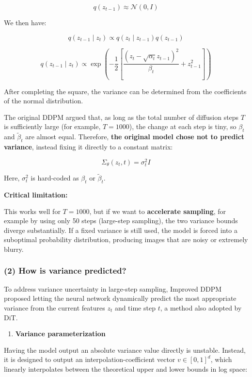 \[
q(z_{t-1})\approx\mathcal{N}(0,I)
\]

We then have:

\[
q(z_{t-1}\mid z_t)\propto q(z_t\mid z_{t-1})q(z_{t-1})
\]

\[
q(z_{t-1}\mid z_t)\propto \exp\left(-\frac{1}{2}\left[\frac{(z_t-\sqrt{\alpha_t}z_{t-1})^2}{\beta_t}+z_{t-1}^2\right]\right)
\]

After completing the square, the variance can be determined from the coefficients of the normal distribution.

The original DDPM argued that, as long as the total number of diffusion steps \(T\) is sufficiently large (for example, \(T=1000\)), the change at each step is tiny, so \(\beta_t\) and \(\tilde{\beta}_t\) are almost equal. Therefore, \textbf{the original model chose not to predict variance}, instead fixing it directly to a constant matrix:

\[
\Sigma_\theta(z_t,t)=\sigma_t^2 I
\]

Here, \(\sigma_t^2\) is hard-coded as \(\beta_t\) or \(\tilde{\beta}_t\).

\textbf{Critical limitation:}

This works well for \(T=1000\), but if we want to \textbf{accelerate sampling}, for example by using only 50 steps (large-step sampling), the two variance bounds diverge substantially. If a fixed variance is still used, the model is forced into a suboptimal probability distribution, producing images that are noisy or extremely blurry.

\hypertarget{how-is-variance-predicted}{%
\subsubsection{(2) How is variance predicted?}\label{how-is-variance-predicted}}

To address variance uncertainty in large-step sampling, Improved DDPM proposed letting the neural network dynamically predict the most appropriate variance from the current features \(z_t\) and time step \(t\), a method also adopted by DiT.

\begin{enumerate}
\def\labelenumi{\arabic{enumi}.}
\tightlist
\item
  \textbf{Variance parameterization}
\end{enumerate}

Having the model output an absolute variance value directly is unstable. Instead, it is designed to output an interpolation-coefficient vector \(v\in[0,1]^d\), which linearly interpolates between the theoretical upper and lower bounds in log space:

